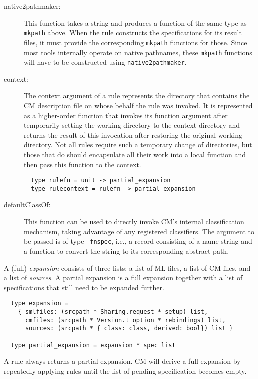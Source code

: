 \begin{description}
\item[native2pathmaker:] This function takes a string and produces a
function of the same type as {\tt mkpath} above.  When the rule
constructs the specifications for its result files, it must provide
the corresponding {\tt mkpath} functions for those.  Since most tools
internally operate on native pathnames, these {\tt mkpath} functions
will have to be constructed using {\tt native2pathmaker}.
\item[context:] The context argument of a rule represents the
directory that contains the CM description file on whose behalf the
rule was invoked.  It is represented as a higher-order function that
invokes its function argument after temporarily setting the working
directory to the context directory and returns the result of this
invocation after restoring the original working directory.  Not all
rules require such a temporary change of directories, but those that
do should encapsulate all their work into a local function and then
pass this function to the context.
\begin{verbatim}
  type rulefn = unit -> partial_expansion
  type rulecontext = rulefn -> partial_expansion
\end{verbatim}
\item[defaultClassOf:] This function can be used to directly invoke
CM's internal classification mechanism, taking advantage of any
registered classifiers.  The argument to be passed is of type {\tt
fnspec}, i.e., a record consisting of a name string and a function to
convert the string to its corresponding abstract path.
\end{description}

A (full) {\em expansion} consists of three lists: a list of ML files,
a list of CM files, and a list of {\em sources}.  A partial expansion
is a full expansion together with a list of specifications that still
need to be expanded further.

\begin{verbatim}
  type expansion =
    { smlfiles: (srcpath * Sharing.request * setup) list,
      cmfiles: (srcpath * Version.t option * rebindings) list,
      sources: (srcpath * { class: class, derived: bool}) list }

  type partial_expansion = expansion * spec list
\end{verbatim}

A rule always returns a partial expansion.  CM will derive a full
expansion by repeatedly applying rules until the list of pending
specification becomes empty.

